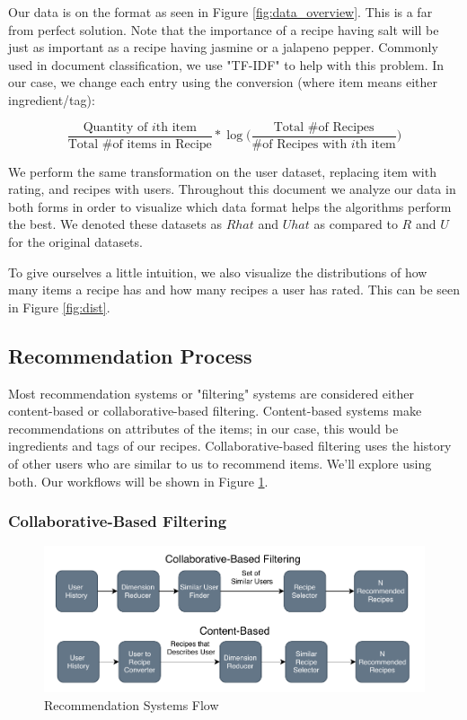 \documentclass[11pt]{article}
\newcommand*\textfrac[2]{
  \frac{\text{#1}}{\text{#2}}
}
\begin{document}
Our data is on the format as seen in Figure \ref{fig:data_overview}. This is a far from perfect solution. Note that the importance of a recipe having salt will be just as important as a recipe having jasmine or a jalapeno pepper. Commonly used in document classification, we use "TF-IDF" to help with this problem. In our case, we change each entry using the conversion (where item means either ingredient/tag):

$$\textfrac{Quantity of $i$th item}{Total \# of items in Recipe} * \log \Big( \textfrac{Total \# of Recipes}{\# of Recipes with $i$th item} \Big)$$

We perform the same transformation on the user dataset, replacing item with rating, and recipes with users. Throughout this document we analyze our data in both forms in order to visualize which data format helps the algorithms perform the best. We denoted these datasets as $Rhat$ and $Uhat$ as compared to $R$ and $U$ for the original datasets.

To give ourselves a little intuition, we also visualize the distributions of how many items a recipe has and how many recipes a user has rated. This can be seen in Figure \ref{fig:dist}.


\subsection{Recommendation Process}
Most recommendation systems or "filtering" systems are considered either content-based or collaborative-based filtering. Content-based systems make recommendations on attributes of the items; in our case, this would be ingredients and tags of our recipes. Collaborative-based filtering uses the history of other users who are similar to us to recommend items. We'll explore using both. Our workflows will be shown in Figure \ref{fig:flow}.

\subsubsection{Collaborative-Based Filtering}

\begin{figure}[t]
\centering
\includegraphics[width=1\textwidth]{figs/flow.pdf}
\caption{Recommendation Systems Flow}
\label{fig:flow}
\end{figure}
\end{document}
